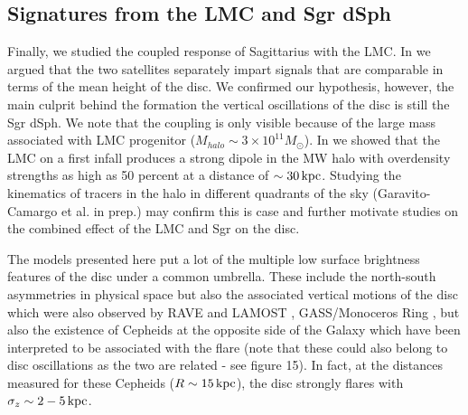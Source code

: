 \documentclass[useAMS,usenatbib]{mnras}
\begin{document}
{\subsection{Signatures from the LMC and Sgr dSph}

Finally, we studied the coupled response of Sagittarius with the LMC. In \cite{laporte16} we argued that the two satellites separately impart signals that are comparable in terms of the mean height of the disc. We confirmed our hypothesis, however, the main culprit behind the formation the vertical oscillations of the disc is still the Sgr dSph. We note that the coupling is only visible because of the large mass associated with LMC progenitor ($M_{halo}\sim 3\times 10^{11} M_{\odot}$). In \citep{laporte16} we showed that the LMC on a first infall produces a strong dipole in the MW halo with overdensity strengths as high as 50 percent at a distance of $\sim 30 \,\rm{kpc}$. Studying the kinematics of tracers in the halo in different quadrants of the sky (Garavito-Camargo et al. in prep.) may confirm this is case and further motivate studies on the combined effect of the LMC and Sgr on the disc. 

The models presented here put a lot of the multiple low surface brightness features of the disc under a common umbrella. These include the north-south asymmetries in physical space \citep{widrow12} but also the associated vertical motions of the disc which were also observed by RAVE and LAMOST \citep{williams13, carlin13}, GASS/Monoceros Ring \citep{newberg03,slater14,morganson16}, but also the existence of Cepheids at the opposite side of the Galaxy \citep{feast14} which have been interpreted to be associated with the flare (note that these could also belong to disc oscillations as the two are related - see figure 15). In fact, at the distances measured for these Cepheids ($R\sim15\,\rm{kpc}$), the disc strongly flares with $\sigma_{z}\sim2-5\, \rm{kpc}$.


}
\end{document}
